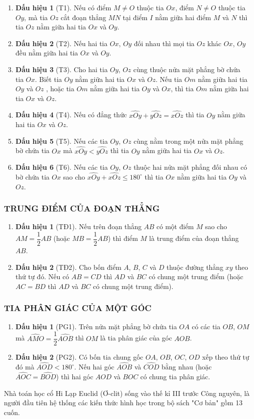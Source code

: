 \begin{enumerate}
	\item \textbf{Dấu hiệu 1} (T1). Nếu có điểm $M \ne O$ thuộc tia $Ox$, điểm $N \ne O$ thuộc tia $Oy$, mà tia $Oz$ cắt đoạn thẳng $MN$ tại điểm $I$ nằm giữa hai điểm $M$ và $N$ thì tia $Oz$ nằm giữa hai tia $Ox$ và $Oy$.
	\item \textbf{Dấu hiệu 2} (T2). Nếu hai tia $Ox$, $Oy$ đối nhau thì mọi tia $Oz$ khác $Ox$, $Oy$ đều nằm giữa  hai tia $Ox$ và $Oy$.
	\item \textbf{Dấu hiệu 3} (T3). Cho hai tia $Oy$, $Oz$ cùng thuộc nửa mặt phẳng bờ chứa tia $Ox$. Biết tia $Oy$ nằm giữa hai tia $Ox$ và $Oz$. Nếu tia $Om$ nằm giữa hai tia $Oy$ và $Oz$ , hoặc tia $Om$ nằm giữa hai tia $Oy$ và $Ox$, thì tia $Om$ nằm giữa hai tia $Ox$ và $Oz$.  
	\item \textbf{Dấu hiệu 4} (T4). Nếu có đẳng thức $\widehat{xOy}+\widehat{yOz}=\widehat{xOz} $ thì tia $Oy$ nằm giữa hai tia $Ox$ và $Oz$. 
	\item \textbf{Dấu hiệu 5} (T5). Nếu các tia $Oy$, $Oz$ cùng nằm trong một nửa mặt phẳng bờ chứa tia $Ox$ mà  $\widehat{xOy}<\widehat{yOz}$ thì tia $Oy$ nằm giữa hai tia $Ox$ và $Oz$. 
	\item \textbf{Dấu hiệu 6} (T6). Nếu các tia $Oy$, $Oz$ thuộc hai nửa mặt phẳng đối nhau có bờ chứa tia $Ox$  sao cho  $\widehat{xOy}+\widehat{xOz} \le 180^\circ $ thì tia $Ox$ nằm giữa hai tia $Oy$ và $Oz$.
\end{enumerate}

\subsubsection{TRUNG ĐIỂM CỦA ĐOẠN THẲNG}
\begin{enumerate}
	\item \textbf{Dấu hiệu 1} (TĐ1). Nếu trên đoạn thẳng $AB$ có một điểm $M$ sao cho $AM=\dfrac{1}{2}AB$ (hoặc $MB=\dfrac{1}{2}AB$) thì điểm $M$ là trung điểm của đoạn thẳng $AB$.
	\item \textbf{Dấu hiệu 2} (TĐ2). Cho bốn điểm $A$, $B$, $C$ và $D$ thuộc đường thẳng $xy$ theo thứ tự đó. Nếu có $AB=CD$ thì $AD$ và $BC$ có chung một trung điểm (hoặc $AC=BD$ thì $AD$ và $BC$ có chung một trung điểm).
\end{enumerate}

\subsubsection{TIA PHÂN GIÁC CỦA MỘT GÓC}
\begin{enumerate}
	\item \textbf{Dấu hiệu 1} (PG1). Trên nửa mặt phẳng bờ chứa tia $OA$ có các tia $OB$, $OM$ mà $\widehat{AMO}=\dfrac{1}{2}\widehat{AOB}$ thì $OM$ là tia phân giác của góc $AOB$.
	\item \textbf{Dấu hiệu 2} (PG2). Có bốn tia chung gốc $OA$, $OB$, $OC$, $OD$ xếp theo thứ tự đó mà $\widehat{AOD}<180^\circ $. Nếu hai góc $\widehat{AOB} $ và $\widehat{COD} $ bằng nhau (hoặc $\widehat{AOC} =\widehat{BOD} $) thì hai góc $AOD$ và $BOC$ có chung tia phân giác.
\end{enumerate}

\begin{note}
	Nhà toán học cổ Hi Lạp Euclid (Ơ-clit)	sống vào thế kỉ III trước Công nguyên, là người đầu tiên hệ thống các kiến thức hình học trong bộ sách "Cơ bản" gồm 13 cuốn.
\end{note}